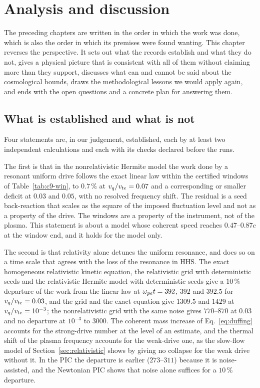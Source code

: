 \chapter{Analysis and discussion}\label{ch:discussion}

The preceding chapters are written in the order in which the work was done, which is also the order in which its premises were found wanting. This chapter reverses the perspective. It sets out what the records establish and what they do not, gives a physical picture that is consistent with all of them without claiming more than they support, discusses what can and cannot be said about the cosmological bounds, draws the methodological lessons we would apply again, and ends with the open questions and a concrete plan for answering them.

\section{What is established and what is not}

Four statements are, in our judgement, established, each by at least two independent calculations and each with its checks declared before the runs.

The first is that in the nonrelativistic Hermite model the work done by a resonant uniform drive follows the exact linear law within the certified windows of Table~\ref{tab:c9-win}, to $0.7\,\%$ at $v_q/v_{te}=0.07$ and a corresponding or smaller deficit at $0.03$ and $0.05$, with no resolved frequency shift. The residual is a seed back-reaction that scales as the square of the imposed fluctuation level and not as a property of the drive. The windows are a property of the instrument, not of the plasma. This statement is about a model whose coherent speed reaches $0.47$--$0.87c$ at the window end, and it holds for the model only.

The second is that relativity alone detunes the uniform resonance, and does so on a time scale that agrees with the loss of the resonance in HHS. The exact homogeneous relativistic kinetic equation, the relativistic grid with deterministic seeds and the relativistic Hermite model with deterministic seeds give a $10\,\%$ departure of the work from the linear law at $\omega_{pe} t=392$, $392$ and $392.5$ for $v_q/v_{te}=0.03$, and the grid and the exact equation give $1309.5$ and $1429$ at $v_q/v_{te}=10^{-3}$; the nonrelativistic grid with the same noise gives $770$--$870$ at $0.03$ and no departure at $10^{-3}$ to $3000$. The coherent mass increase of Eq.~\eqref{eq:duffing} accounts for the strong-drive number at the level of an estimate, and the thermal shift of the plasma frequency accounts for the weak-drive one, as the slow-flow model of Section~\ref{sec:relativistic} shows by giving no collapse for the weak drive without it. In the PIC the departure is earlier ($273$--$311$) because it is noise-assisted, and the Newtonian PIC shows that noise alone suffices for a $10\,\%$ departure.

